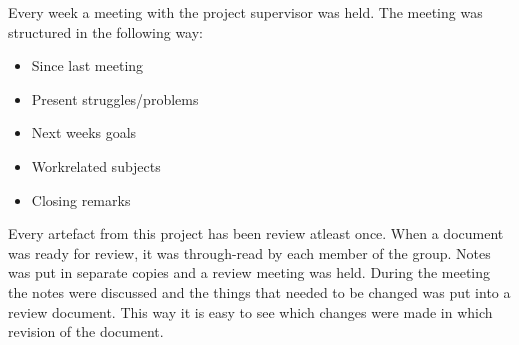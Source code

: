 Every week a meeting with the project supervisor was held. The meeting was structured in the following way:
\begin{itemize}
\item Since last meeting
\item Present struggles/problems
\item Next weeks goals
\item Workrelated subjects
\item Closing remarks
\end{itemize}

Every artefact from this project has been review atleast once. When a document was ready for review, it was through-read by each member of the group. Notes was put in separate copies and a review meeting was held. During the meeting the notes were discussed and the things that needed to be changed was put into a review document. This way it is easy to see which changes were made in which revision of the document.
